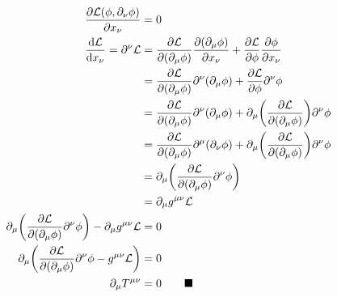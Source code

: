 \documentclass{article}
\begin{document}
\begin{align*}
  \pdv{\mathcal{L}(\phi,\partial_\nu \phi)}{x_\nu}                                                               & =0                                                                                                                                                  \\
  \dv{\mathcal{L}}{x_\nu}=\partial^\nu \mathcal{L}                                                               & =\pdv{\mathcal{L}}{(\partial_\mu \phi)}\pdv{(\partial_\mu \phi)}{x_\nu}+\pdv{\mathcal{L}}{\phi}\pdv{\phi}{x_\nu}                                    \\
                                                                                                                 & =\pdv{\mathcal{L}}{(\partial_\mu \phi)}\partial^\nu (\partial_\mu \phi)+\pdv{\mathcal{L}}{\phi}\partial^\nu \phi                                    \\
                                                                                                                 & =\pdv{\mathcal{L}}{(\partial_\mu \phi)}\partial^\nu (\partial_\mu \phi)+\partial_\mu \pqty{\pdv{\mathcal{L}}{(\partial_\mu \phi)}}\partial^\nu \phi \\
                                                                                                                 & =\pdv{\mathcal{L}}{(\partial_\mu \phi)}\partial^\mu (\partial_\nu \phi)+\partial_\mu \pqty{\pdv{\mathcal{L}}{(\partial_\mu \phi)}}\partial^\nu \phi \\
                                                                                                                 & =\partial_\mu \pqty{\pdv{\mathcal{L}}{(\partial_\mu \phi)}\partial^\nu \phi}                                                                        \\
                                                                                                                 & =\partial_\mu g^{\mu\nu}\mathcal{L}                                                                                                                 \\
  \partial_\mu \pqty{\pdv{\mathcal{L}}{(\partial_\mu \phi)}\partial^\nu \phi}-\partial_\mu g^{\mu\nu}\mathcal{L} & =0                                                                                                                                                  \\
  \partial_\mu \pqty{\pdv{\mathcal{L}}{(\partial_\mu \phi)}\partial^\nu \phi- g^{\mu\nu}\mathcal{L}}             & =0                                                                                                                                                  \\
  \partial_\mu T^{\mu\nu}                                                                                        & =0           \qquad\blacksquare                                                                                                                     \\
\end{align*}
\end{document}
